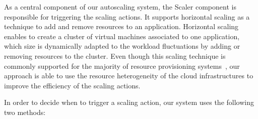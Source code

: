 

As a central component of our autoscaling system, the Scaler component is responsible for triggering the scaling actions. It supports horizontal scaling as a technique to add and remove resources to an application. Horizontal scaling enables to create a cluster of virtual machines associated to one application, which size is dynamically adapted to the workload fluctuations by adding or removing resources to the cluster. Even though this scaling technique is commonly supported for the majority of resource provisioning systems~\cite{ali-eldin_2012,bunch_2012,urgaonkar_agile_2008}, our approach is able to use the resource heterogeneity of the cloud infrastructures to improve the efficiency of the scaling actions.

In order to decide when to trigger a scaling action, our system uses the following two methods: 



